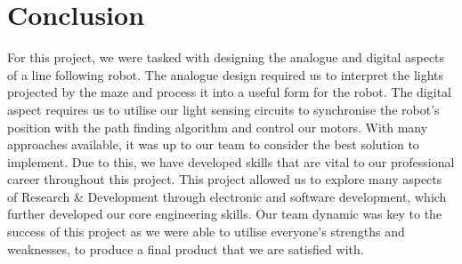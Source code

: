 \section{Conclusion}
For this project, we were tasked with designing the analogue and digital aspects of a line following robot. The analogue design required us to interpret the lights projected by the maze and process it into a useful form for the robot. The digital aspect requires us to utilise our light sensing circuits to synchronise the robot’s position with the path finding algorithm and control our motors. With many approaches available, it was up to our team to consider the best solution to implement. Due to this, we have developed skills that are vital to our professional career throughout this project. This project allowed us to explore many aspects of Research \& Development through electronic and software development, which further developed our core engineering skills. Our team dynamic was key to the success of this project as we were able to utilise everyone’s strengths and weaknesses, to produce a final product that we are satisfied with.

